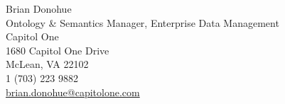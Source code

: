Brian Donohue
\\Ontology \& Semantics Manager, Enterprise Data Management
  \\ Capitol One
  \\ 1680 Capitol One Drive
  \\ McLean, VA 22102
  \\ 1 (703) 223 9882
  \\ \href{mailto:brian.donohue@capitolone.com}{brian.donohue@capitolone.com}
